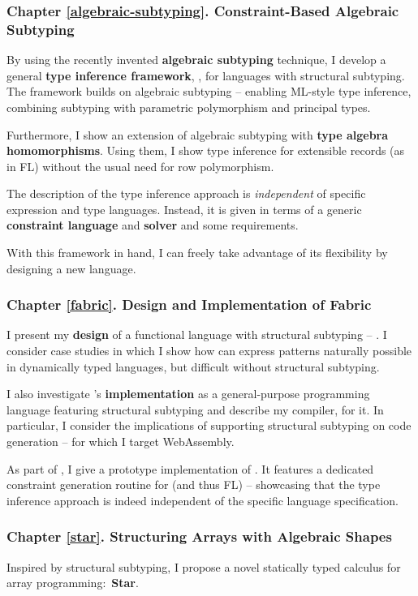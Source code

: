 \subsubsection{Chapter \ref{algebraic-subtyping}. Constraint-Based Algebraic Subtyping}

By using the recently invented \textbf{algebraic subtyping} technique, I develop a general \textbf{type inference framework}, \inference{}, for languages with structural subtyping. 
The framework builds on algebraic subtyping -- enabling ML-style type inference, combining subtyping with parametric polymorphism and principal types. 

Furthermore, I show an extension of algebraic subtyping with \textbf{type algebra homomorphisms}. Using them, I show type inference for extensible records (as in FL) without the usual need for row polymorphism.

The description of the type inference approach is \emph{independent} of specific expression and type languages. Instead, it is given in terms of a generic \textbf{constraint language} and \textbf{solver} and some requirements. 

With this framework in hand, I can freely take advantage of its flexibility by designing a new language.

\subsubsection{Chapter \ref{fabric}. Design and Implementation of Fabric}
I present my \textbf{design} of a functional language with structural subtyping -- \textbf{\fabric{}}. 
I consider case studies in which I show how \fabric{} can express patterns naturally possible in dynamically typed languages, but difficult without structural subtyping. 

I also investigate \fabric{}'s \textbf{implementation} as a general-purpose programming language featuring structural subtyping and describe my compiler, \compiler{} for it. In particular, I consider the implications of supporting structural subtyping on code generation -- for which I target WebAssembly.

As part of \compiler{}, I give a prototype implementation of \inference{}. It features a dedicated constraint generation routine for \fabric{} (and thus FL) -- showcasing that the type inference approach is indeed independent of the specific language specification.

\subsubsection{Chapter \ref{star}. Structuring Arrays with Algebraic Shapes}
Inspired by structural subtyping, I propose a novel statically typed calculus for array  programming:~\textbf{Star}. 

